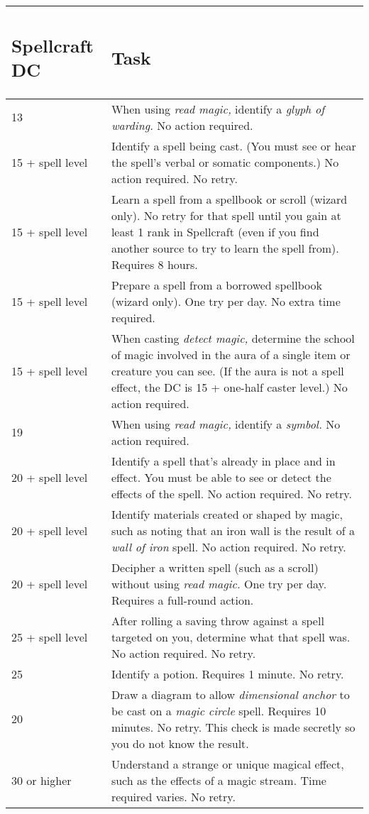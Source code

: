 \documentclass{article}
\begin{document}
\vspace{12pt}
\begin{tabular}{|>{\raggedright}p{46pt}|>{\raggedright}p{280pt}|}
\hline
\subsection*{S\textbf{pellcraft DC }} & \subsection*{T\textbf{ask}}\tabularnewline
\hline
13  & When using \textit{read magic, }identify a \textit{glyph of warding. }No 
action required.\tabularnewline
\hline
15 + spell level  & Identify a spell being cast. (You must see or hear the spell's 
verbal or somatic components.) No action required. No retry. \tabularnewline
\hline
15 + spell level  & Learn a spell from a spellbook or scroll (wizard only). No 
retry for that spell until you gain at least 1 rank in Spellcraft (even if you 
find another source to try to learn the spell from). Requires 8 hours.\tabularnewline
\hline
15 + spell level  & Prepare a spell from a borrowed spellbook (wizard only). One 
try per day. No extra time required. \tabularnewline
\hline
15 + spell level  & When casting \textit{detect magic, }determine the school of 
magic involved in the aura of a single item or creature you can see. (If the aura 
is not a spell effect, the DC is 15 + one-half caster level.) No action required.\tabularnewline
\hline
19  & When using \textit{read magic, }identify a \textit{symbol. }No action required.\tabularnewline
\hline
20 + spell level  & Identify a spell that's already in place and in effect. You 
must be able to see or detect the effects of the spell. No action required. No 
retry.\tabularnewline
\hline
20 + spell level  & Identify materials created or shaped by magic, such as noting 
that an iron wall is the result of a \textit{wall of iron }spell. No action required. 
No retry.\tabularnewline
\hline
20 + spell level  & Decipher a written spell (such as a scroll) without using \textit{read 
magic. }One try per day. Requires a full-round action.\tabularnewline
\hline
25 + spell level  & After rolling a saving throw against a spell targeted on you, 
determine what that spell was. No action required. No retry.\tabularnewline
\hline
25  & Identify a potion. Requires 1 minute. No retry.\tabularnewline
\hline
20  & Draw a diagram to allow \textit{dimensional anchor }to be cast on a \textit{magic 
circle }spell. Requires 10 minutes. No retry. This check is made secretly so you 
do not know the result.\tabularnewline
\hline
30 or higher  & Understand a strange or unique magical effect, such as the effects 
of a magic stream. Time required varies. No retry.\tabularnewline
\hline
\end{tabular}
\end{document}
